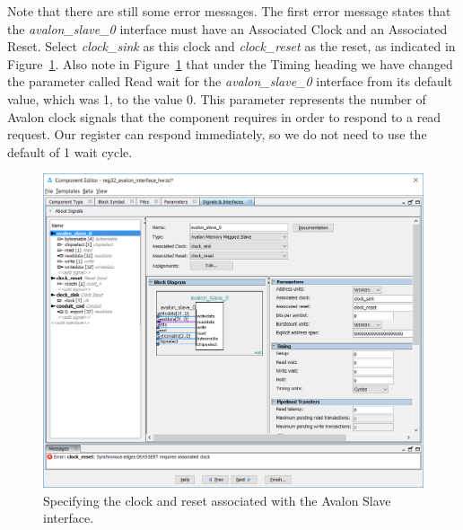 \documentclass[11pt, twoside, pdftex]{article}
\begin{document}
\clearpage
\newpage
Note that there are still some error messages. The first error message states that the {\it avalon\_slave\_0} interface must have an 
Associated Clock and an Associated Reset.  Select {\it clock\_sink} as this clock 
and {\it clock\_reset} as the reset, as indicated in Figure~\ref{fig:22}.
Also note in Figure~\ref{fig:22} that under the {\sf Timing} heading we have changed the 
parameter called {\sf Read wait} for the {\it avalon\_slave\_0} interface from its 
default value, which was 1, to the value 0. This parameter represents the number of
Avalon clock signals that the component requires in order to respond to a read
request. Our register can respond immediately, so we do not need to use the default of 1 wait 
cycle.

\begin{figure}[H]
   \begin{center}
        \includegraphics[scale=0.6]{figures/figure22.png}
   \end{center}
   \caption{Specifying the clock and reset associated with the Avalon Slave interface.}
	\label{fig:22}
\end{figure}
\end{document}
